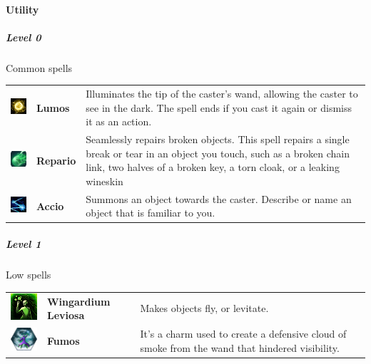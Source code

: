 \paragraph{Utility} 


\subparagraph{Level 0} 
Common spells \\
\begin{tabular}{ m{2cm}m{3cm}m{8cm}} 
  \includegraphics[width=2cm]{../Pictures/Gameplay/Spells/Icon/Lumos_spell_icon.png} & \textbf{Lumos} & Illuminates the tip of the caster's wand, allowing the caster to see in the dark. The spell ends if you cast it again or dismiss it as an action.\\ 
	\includegraphics[width=2cm]{../Pictures/Gameplay/Spells/Icon/Repario_spell_icon.png} & \textbf{Repario} & Seamlessly repairs broken objects. This spell repairs a single break or tear in an object you touch, such as a broken chain link, two halves of a broken key, a torn cloak, or a leaking wineskin \\ 
	\includegraphics[width=2cm]{../Pictures/Gameplay/Spells/Icon/Accio_spell_icon.png} & \textbf{Accio} &  Summons an object towards the caster. Describe or name an object that is familiar to you. \\ 
\end{tabular}

\subparagraph{Level 1} 
 Low  spells\\
\begin{tabular}{ m{2cm}m{3cm}m{8cm} } 
 \includegraphics[width=2cm]{../Pictures/Gameplay/Spells/Icon/Wingardium_spell_icon.png} & \textbf{Wingardium Leviosa} & Makes objects fly, or levitate.   \\ 
	\includegraphics[width=2cm]{../Pictures/Gameplay/Spells/Icon/Fumos_spell_icon.png} & \textbf{Fumos} & It's a charm used to create a defensive cloud of smoke from the wand that hindered visibility. \\  
\end{tabular}

